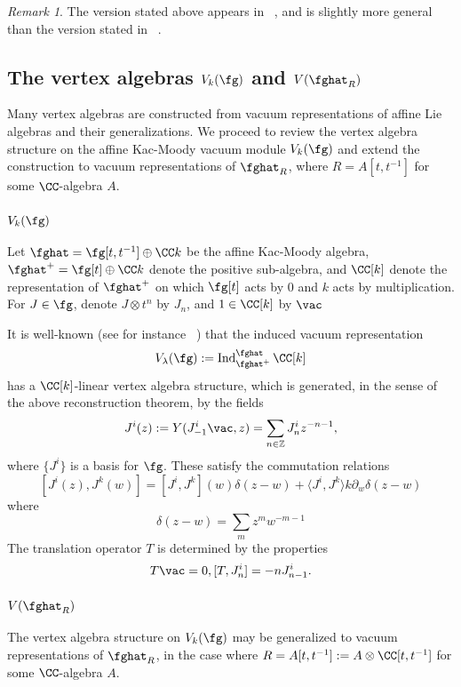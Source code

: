 \documentclass[12pt]{amsart}
\theoremstyle{definition}
\theoremstyle{remark}
\newtheorem{rmk}[theorem]{Remark}
\newcommand{\on}{\operatorname}
\newcommand{\R}{R}
\begin{document}
\begin{rmk}
The version stated above appears in ~\cite{DSK}, and is slightly more general than the version stated in ~\cite{FBZ}. 
\end{rmk}

\subsection{The vertex algebras $V_{k}(\fg)$ and $V(\fghat_{\R})$}

Many vertex algebras are constructed from vacuum representations of affine Lie algebras and their generalizations. We proceed to review the vertex algebra structure on the affine Kac-Moody vacuum module $V_{k}(\fg)$ and extend the construction to vacuum representations of $\fghat_{R}$, where $R=A[t,t^{-1}]$ for some $\CC$-algebra $A$.

\subsubsection{$V_{k}(\fg)$}
Let $\fghat = \fg[t,t^{-1}] \oplus \CC k$ be the affine Kac-Moody algebra, $\fghat^{+} = \fg[t] \oplus \CC k$ denote the positive sub-algebra, and $\CC[k]$ denote the representation of $\fghat^{+}$ on which $\fg[t]$ acts by $0$ and $k$ acts by multiplication. For $J \in \fg$, denote $J \otimes t^n$ by $J_n$, and $1 \in \CC[k]$ by $\vac$

It is well-known (see for instance ~\cite{FBZ}) that the induced vacuum representation
\[
V_{\lambda}(\fg) := \on{Ind}^{\fghat}_{\fghat^+} \CC[k]
\] 
has a $\CC[k]$-linear vertex algebra structure, which is generated, in the sense of the above reconstruction theorem, by the fields
\[
J^i (z) := Y(J^{i}_{-1} \vac, z) = \sum_{n \in \mathbb{Z}} J^i_n z^{-n-1},
\]
where $\{ J^{i} \}$ is a basis for $\fg$. These satisfy the commutation relations
\[
[J^i(z), J^{k}(w)] = [J^{i}, J^{k}](w) \delta(z-w) +  \langle J^{i}, J^{k} \rangle k \partial_w \delta(z-w)
\]
where 
\[
\delta(z-w) = \sum_{m} z^{m} w^{-m-1} 
\]
The translation operator $T$ is determined by the properties
\[
T \vac =0, [T, J^i_n] = -n J^{i}_{n-1}.
\]


\subsubsection{$V(\fghat_{\R})$}

The vertex algebra structure on $V_{k}(\fg)$ may be generalized to vacuum representations of $\fghat_{\R}$, in the case where $\R = A[t,t^{-1}] := A \otimes \CC[t,t^{-1}]$ for some $\CC$-algebra $A$. 
\end{document}
